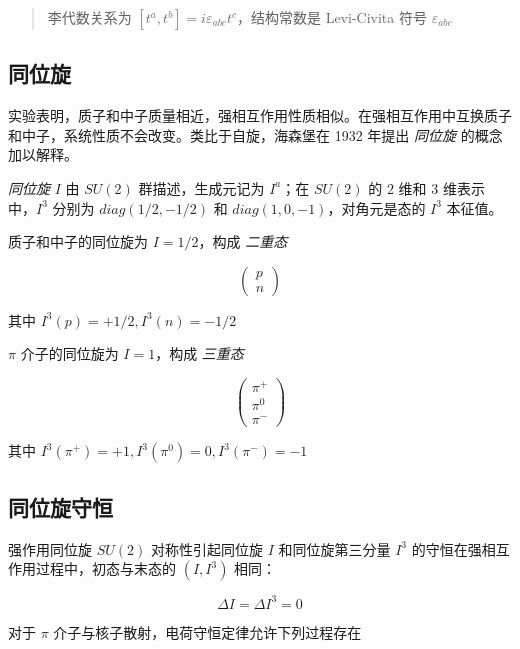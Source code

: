 \begin{quote}
    李代数关系为 $[t^a, t^b]=i \varepsilon_{abc} t^c$，结构常数是 Levi-Civita 符号 $\varepsilon_{abc}$
\end{quote}

\subsection{同位旋}

实验表明，质子和中子质量相近，强相互作用性质相似。在强相互作用中互换质子和中子，系统性质不会改变。类比于自旋，海森堡在 1932 年提出 \emph{同位旋} 的概念加以解释。

\emph{同位旋} $I$ 由 $SU(2)$ 群描述，生成元记为 $I^a$；在 $SU(2)$ 的 $2$ 维和 $3$ 维表示中，$I^3$ 分别为 $diag(1/2, -1/2)$ 和 $diag(1, 0, -1)$，对角元是态的 $I^3$ 本征值。

质子和中子的同位旋为 $I=1/2$，构成 \emph{二重态}

\begin{equation}
    \begin{pmatrix}
        p \\
        n
    \end{pmatrix}
\end{equation}

其中 $I^3(p)=+1/2, I^3(n)=-1/2$

$\pi$ 介子的同位旋为 $I=1$，构成 \emph{三重态}

\begin{equation}
    \begin{pmatrix}
        \pi^+ \\
        \pi^0 \\
        \pi^-
    \end{pmatrix}
\end{equation}

其中 $I^3(\pi^+)=+1, I^3(\pi^0)=0, I^3(\pi^-)=-1$

\subsection{同位旋守恒}

强作用同位旋 $SU(2)$ 对称性引起同位旋 $I$ 和同位旋第三分量 $I^3$ 的守恒在强相互作用过程中，初态与末态的 $(I, I^3)$ 相同：

\begin{equation}
    \Delta I = \Delta I^3 = 0
\end{equation}

对于 $\pi$ 介子与核子散射，电荷守恒定律允许下列过程存在

